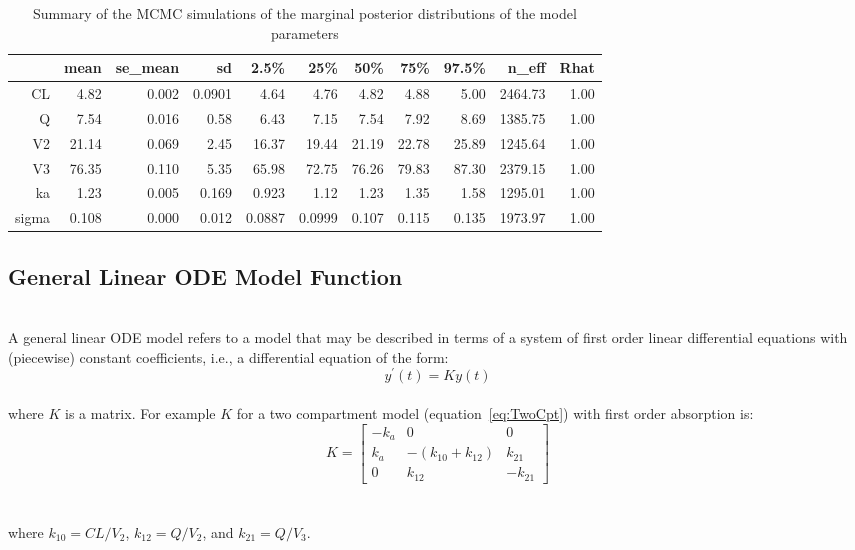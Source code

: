\documentclass[11pt]{amsart}
\begin{document}
\begin{table}[!htb]
\centering
\caption{Summary of the MCMC simulations of the marginal posterior distributions of the model parameters}
\begin{tabular}{rrrrrrrrrrr}
  \hline
 & mean & se\_mean & sd & 2.5\% & 25\% & 50\% & 75\% & 97.5\% & n\_eff & Rhat \\ 
  \hline
CL & 4.82 & 0.002 & 0.0901 & 4.64 & 4.76 & 4.82 & 4.88 & 5.00 & 2464.73 & 1.00 \\ 
  Q & 7.54 & 0.016 & 0.58 & 6.43 & 7.15 & 7.54 & 7.92 & 8.69 & 1385.75 & 1.00 \\ 
  V2 & 21.14 & 0.069 & 2.45 & 16.37 & 19.44 & 21.19 & 22.78 & 25.89 & 1245.64 & 1.00 \\ 
  V3 & 76.35 & 0.110 & 5.35 & 65.98 & 72.75 & 76.26 & 79.83 & 87.30 & 2379.15 & 1.00 \\ 
  ka & 1.23 & 0.005 & 0.169 & 0.923 & 1.12 & 1.23 & 1.35 & 1.58 & 1295.01 & 1.00 \\
  sigma & 0.108 &  0.000 & 0.012 & 0.0887 & 0.0999 & 0.107 & 0.115 & 0.135 & 1973.97 & 1.00 \\
   \hline
\end{tabular}
\end{table}

\clearpage

\subsection{General Linear ODE Model Function} \ \\

A general linear ODE model refers to a model that may be described in terms of a system of first order linear differential equations with (piecewise) constant coefficients, i.e., a differential equation of the form: \\
$$ y^\prime\left(t\right) = Ky\left(t\right) $$ \\
where $K$ is a matrix. For example $K$ for a two compartment model (equation~\ref{eq:TwoCpt}) with first order absorption is: \\
$$   K = \left[\begin{array}{ccc}
	-k_a & 0 & 0 \\
	k_a & -\left(k_{10} + k_{12}\right) & k_{21} \\
	0 & k_{12} & -k_{21}
	\end{array}\right] $$ \\ \ \\
where $k_{10} = CL / V_2 $, $ k_{12} = Q / V_2 $, and $k_{21} = Q / V_3 $.
\end{document}
